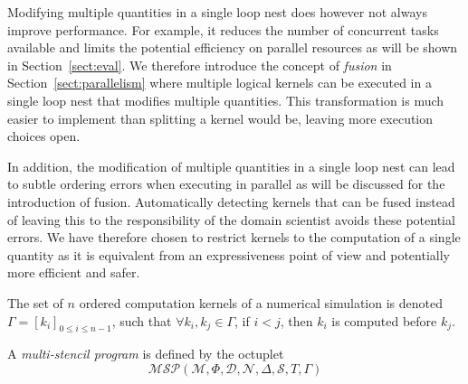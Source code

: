 Modifying multiple quantities in a single loop nest does however not always improve performance.
For example, it reduces the number of concurrent tasks available and limits the potential efficiency on parallel resources as will be shown in Section~\ref{sect:eval}.
We therefore introduce the concept of \emph{fusion} in Section~\ref{sect:parallelism} where multiple logical kernels can be executed in a single loop nest that modifies multiple quantities.
This transformation is much easier to implement than splitting a kernel would be, leaving more execution choices open.

In addition, the modification of multiple quantities in a single loop nest can lead to subtle ordering errors when executing in parallel as will be discussed for the introduction of fusion.
Automatically detecting kernels that can be fused instead of leaving this to the responsibility of the domain scientist avoids these potential errors.
We have therefore chosen to restrict kernels to the computation of a single quantity as it is equivalent from an expressiveness point of view and potentially more efficient and safer.


\begin{mydef}
The set of $n$ ordered computation kernels of a numerical simulation is denoted $\Gamma = [k_i]_{0 \leq i \leq n-1}$, such that $\forall k_i,k_j \in \Gamma$, if $i < j$, then $k_i$ is computed before $k_j$.
\end{mydef}

\begin{mydef}
A \textit{multi-stencil program} is defined by the octuplet 
\begin{equation}
\mathcal{MSP}(\mathcal{M},\Phi,\mathcal{D},\mathcal{N},\Delta, \mathcal{S},T,\Gamma)
\label{eq:msp}
\end{equation}
\end{mydef}

